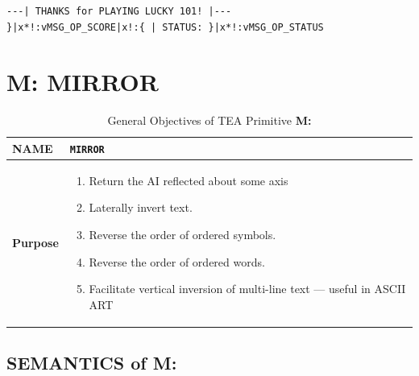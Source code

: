 \documentclass[a4paper, 18pt]{book} %
\begin{document}
{\begin{tcolorbox}[teaterminalstyle, title=CLEAN TEA Program: The High-Order Transformer: LUCKY 101 Brain-Game, breakable]
\begin{lstlisting}[language=TEA,breaklines=true]
---| THANKS for PLAYING LUCKY 101! |---
}|x*!:vMSG_OP_SCORE|x!:{ | STATUS: }|x*!:vMSG_OP_STATUS
   \end{lstlisting}
  \end{tcolorbox}
  \label{FIGLUCKY101CODE_CLEAN}
  }
  
  
\vspace{2em}




\chapter{M: MIRROR}
\label{CHAPM}


\begin{table}[H]
  \centering
  \LARGE
	\begin{tabular}[t]{|p{}|p{}}
 
	\textbf{NAME} & \texttt{MIRROR}\\
	\hline
	\textbf{Purpose} & \begin{enumerate}
	\item Return the AI reflected about some axis
	\item Laterally invert text.
	\item Reverse the order of ordered symbols.
	\item Reverse the order of ordered words.
	\item Facilitate vertical inversion of multi-line text --- useful in ASCII ART
	\end{enumerate}\\
	\hline
	              
\end{tabular}
\caption{General Objectives of TEA Primitive \textbf{M:}}
  \label{TABTAZM}
\end{table}


\section{SEMANTICS of M:}
\label{SECSEMM}
\end{document}
